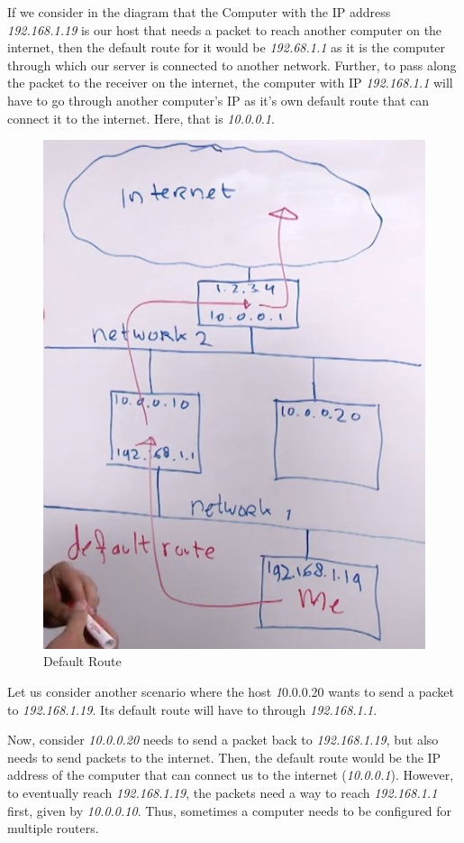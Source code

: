If we consider in the diagram that the Computer with the IP address \textit{192.168.1.19} is our host that needs a packet to reach another computer on the internet, then the default route for it would be \textit{192.68.1.1} as it is the computer through which our server is connected to another network. Further, to pass along the packet to the receiver on the internet, the computer with IP \textit{192.168.1.1} will have to go through another computer's IP as it's own default route that can connect it to the internet. Here, that is \textit{10.0.0.1}.

\begin{figure}[H]
	\centering
	\includegraphics[height=0.9\linewidth]{"RHCSA/Mod1/chapters/1.9.a Default Route"}
	\caption{Default Route}
	\label{fig:1}
\end{figure}
\vspace{-5pt}

Let us consider another scenario where the host \textit10.0.0.20{} wants to send a packet to \textit{192.168.1.19}. Its default route will have to through \textit{192.168.1.1}. 

Now, consider \textit{10.0.0.20} needs to send a packet back to \textit{192.168.1.19}, but also needs to send packets to the internet. Then, the default route would be the IP address of the computer that can connect us to the internet (\textit{10.0.0.1}). However,  to eventually reach \textit{192.168.1.19}, the packets need a way to reach \textit{192.168.1.1} first, given by \textit{10.0.0.10}. Thus, sometimes a computer needs to be configured for multiple routers.

